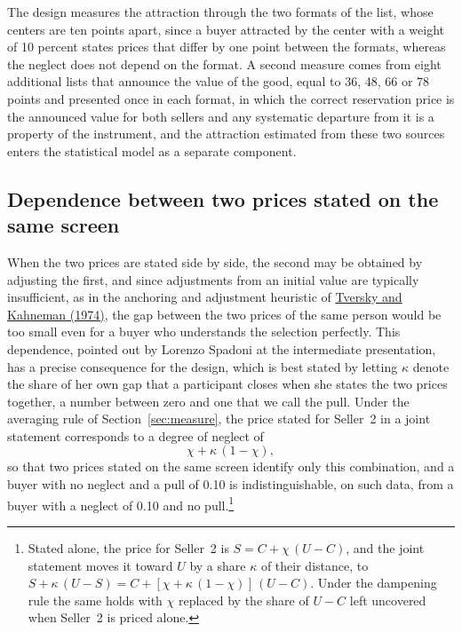 \documentclass[11pt,a4paper]{article}
\newcommand{\cy}[2]{\hyperlink{cite.#1}{\textcolor{citecolor}{#2}}}
\begin{document}
The design measures the attraction through the two formats of the list, whose centers are ten points apart, since a buyer attracted by the center with a weight of 10 percent states prices that differ by one point between the formats, whereas the neglect does not depend on the format. A second measure comes from eight additional lists that announce the value of the good, equal to 36, 48, 66 or 78 points and presented once in each format, in which the correct reservation price is the announced value for both sellers and any systematic departure from it is a property of the instrument, and the attraction estimated from these two sources enters the statistical model as a separate component.

\subsection{Dependence between two prices stated on the same screen}\label{sec:pull}

When the two prices are stated side by side, the second may be obtained by adjusting the first, and since adjustments from an initial value are typically insufficient, as in the anchoring and adjustment heuristic of \cy{tversky}{Tversky and Kahneman (1974)}, the gap between the two prices of the same person would be too small even for a buyer who understands the selection perfectly. This dependence, pointed out by Lorenzo Spadoni at the intermediate presentation, has a precise consequence for the design, which is best stated by letting $\kappa$ denote the share of her own gap that a participant closes when she states the two prices together, a number between zero and one that we call the pull. Under the averaging rule of Section~\ref{sec:measure}, the price stated for Seller~2 in a joint statement corresponds to a degree of neglect of
\[
\chi+\kappa\,(1-\chi),
\]
so that two prices stated on the same screen identify only this combination, and a buyer with no neglect and a pull of 0.10 is indistinguishable, on such data, from a buyer with a neglect of 0.10 and no pull.\footnote{Stated alone, the price for Seller~2 is $S=C+\chi\,(U-C)$, and the joint statement moves it toward $U$ by a share $\kappa$ of their distance, to $S+\kappa\,(U-S)=C+[\chi+\kappa\,(1-\chi)]\,(U-C)$. Under the dampening rule the same holds with $\chi$ replaced by the share of $U-C$ left uncovered when Seller~2 is priced alone.}
\end{document}
